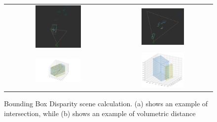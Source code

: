 \begin{figure}[h]
    \centering
    \setlength{\tabcolsep}{1pt}  %
    \renewcommand{\arraystretch}{0.5}
    \begin{tabular}{c c}
        
        \includegraphics[width=0.45\textwidth]{images/experiments/frame_0_3d_scene.png} &
        \includegraphics[width=0.45\textwidth]{images/experiments/frame_2_3d_scene.png} \\
        
        \includegraphics[width=0.45\textwidth]{images/experiments/frame_0_3d_bb.png} &
        \includegraphics[width=0.45\textwidth]{images/experiments/frame_2_3d_bb.png} \\

    \end{tabular}
    
    \caption{Bounding Box Disparity scene calculation. (a) shows an example of intersection, while (b) shows an example of volumetric distance}
    \label{fig:bbox_disparity}
\end{figure}


